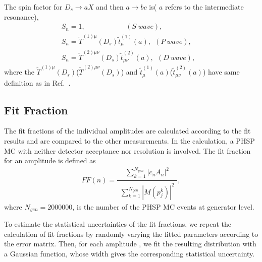 {{        The spin factor for $D_{s} \rightarrow aX$ and then $a \rightarrow bc$ is( $a$ refers to the intermediate resonance), 
        \begin{equation}
            \begin{array}{lr}
                S_{n} = 1,         \ \ \ \ \ \  \ \ \ \ \ \ \ \ \ \ \ \  \ \ \ \ \ \ \ \ (S\ wave), &\\
                S_{n} = \tilde{T}^{(1)\mu}(D_{s})\tilde{t}^{(1)}_{\mu}(a),\ \          (P\ wave), &\\
                S_{n} = \tilde{T}^{(2)\mu\nu}(D_{s})\tilde{t}^{(2)}_{\mu\nu}(a),\ \         (D\ wave), &
            \end{array}\label{spin-factor} 
        \end{equation}
        where the $\tilde{T}^{(1)\mu}(D_{s})$($\tilde{T}^{(2)\mu\nu}(D_{s})$) and $\tilde{t}^{(1)}_{\mu}(a)$($\tilde{t}^{(2)}_{\mu\nu}(a)$) have same definition as in Ref.~\cite{covariant-tensors}.
    }

}


\subsection{Fit Fraction}
\label{FF}
\par{
The fit fractions of the individual amplitudes are calculated according to the fit results and are compared to the other measurements. In the calculation, a PHSP MC with neither detector acceptance nor resolution is involved. The fit fraction for an amplitude is defined as
    \begin{equation}
    FF(n) = \frac{\begin{matrix}\sum_{k=1}^{N_{gen}} \left|c_{n}A_{n}\right|^{2}\end{matrix}}{\begin{matrix}\sum_{k=1}^{N_{gen}} \left|M(p_{j}^{k})\right|^{2}\end{matrix}}, \label{Fit-Fraction-Definition}
    \end{equation}
    where $N_{gen} = 2000000$, is the number of the PHSP MC events at generator level. 

    To estimate the statistical uncertainties of the fit fractions, we repeat the calculation of fit fractions by randomly varying the fitted parameters according to the error matrix. 
    Then, for each amplitude , we fit the resulting distribution with a Gaussian function, whose width gives the corresponding statistical uncertainty.
}

